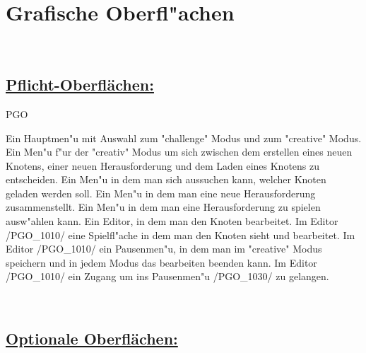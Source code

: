%
%


%
%
\clearpage


\section{Grafische Oberfl{"a}chen}
\label{NU:GO}~\\

\subsection*{\underline{Pflicht-Oberflächen:}}

\begin{ids}{\gls{PGO}}

	\id[0010] Ein Hauptmen{"u} mit Auswahl zum "challenge" Modus und zum "creative" Modus.
	\id[0020] Ein Men{"u} f{"u}r der "creativ" Modus um sich zwischen dem erstellen eines neuen Knotens, einer neuen Herausforderung und dem Laden eines Knotens zu entscheiden.
	\id[0030] Ein Men{"u} in dem man sich aussuchen kann, welcher Knoten geladen werden soll.
	\id[0040] Ein Men{"u} in dem man eine neue Herausforderung zusammenstellt.
	\id[0050] Ein Men{"u} in dem man eine Herausforderung zu spielen ausw{"a}hlen kann.
	\id[1010] Ein Editor, in dem man den Knoten bearbeitet.
	\id[1020] Im Editor /PGO_1010/ eine Spielfl{"a}che in dem man den Knoten sieht und bearbeitet.
	\id[1030] Im Editor /PGO_1010/ ein Pausenmen{"u}, in dem man im "creative" Modus speichern und in jedem Modus das bearbeiten beenden kann.
	\id[1040] Im Editor /PGO_1010/ ein Zugang um ins Pausenmen{"u} /PGO_1030/ zu gelangen.

\end{ids}


~\\


\subsection*{\underline{Optionale Oberflächen:}}

